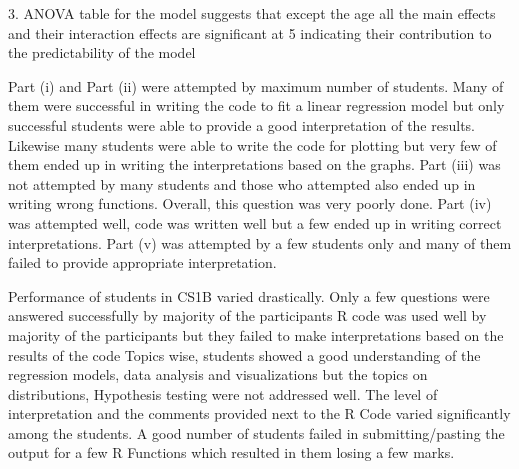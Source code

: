 \documentclass[a4paper,12pt]{article}
\begin{document}
3.
ANOVA table for the model suggests that except the age all the main effects and
their interaction effects are significant at 5%
indicating their
contribution to the predictability of the model


Part (i) and Part (ii) were attempted by maximum number of students. Many of them
were successful in writing the code to fit a linear regression model but only successful
students were able to provide a good interpretation of the results. Likewise many
students were able to write the code for plotting but very few of them ended up in
writing the interpretations based on the graphs. Part (iii) was not attempted by many
students and those who attempted also ended up in writing wrong functions. Overall,
this question was very poorly done. Part (iv) was attempted well, code was written well
but a few ended up in writing correct interpretations. Part (v) was attempted by a few
students only and many of them failed to provide appropriate interpretation.

\newpage

Performance of students in CS1B varied drastically. Only a few questions were
answered successfully by majority of the participants
R code was used well by majority of the participants but they failed to make
interpretations based on the results of the code
Topics wise, students showed a good understanding of the regression models, data
analysis and visualizations but the topics on distributions, Hypothesis testing were not
addressed well.
The level of interpretation and the comments provided next to the R Code varied
significantly among the students.
A good number of students failed in submitting/pasting the output for a few R
Functions which resulted in them losing a few marks.
\end{document}
